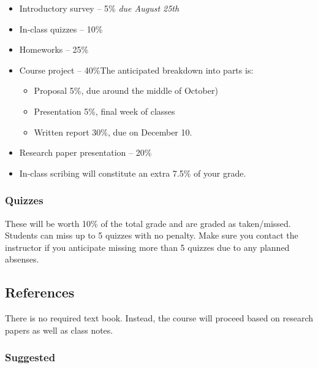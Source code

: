 \documentclass{article}
\begin{document}
\begin{itemize}%
\item Introductory survey --{} 5\% \emph{due August 25th}


\item In-class quizzes --{} 10\%


\item Homeworks --{} 25\%


\item Course project --{} 40\%\newline The anticipated breakdown into parts is:

\begin{itemize}%
\item Proposal 5\%, due around the middle of October)
\item Presentation 5\%, final week of classes
\item Written report 30\%, due on December 10.

\end{itemize}

\item Research paper presentation --{} 20\%


\item In-class scribing will constitute an extra 7.5\% of your grade.



\end{itemize}
\hypertarget{quizzes_8}{}\subsubsection*{{Quizzes}}\label{quizzes_8}

These will be worth 10\% of the total grade and are graded as taken/missed. Students can miss up to 5 quizzes with no penalty. Make sure you contact the instructor if you anticipate missing more than 5 quizzes due to any planned absenses.

\hypertarget{references_9}{}\subsection*{{References}}\label{references_9}

There is no required text book. Instead, the course will proceed based on research papers as well as class notes.

\hypertarget{suggested_10}{}\subsubsection*{{Suggested}}\label{suggested_10}
\end{document}
